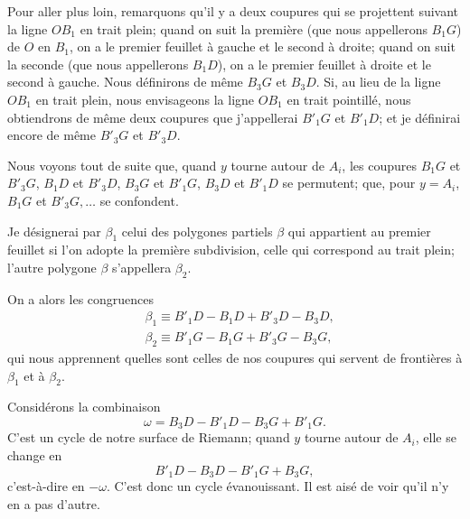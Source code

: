 \documentclass{article}
\begin{document}
Pour aller plus loin, remarquons qu'il y a deux coupures qui se projettent suivant la ligne $OB_{1}$ en trait plein; quand on suit la première (que nous appellerons $B_{1}G$) de $O$ en $B_{1}$, on a le premier feuillet à gauche et le second à droite; quand on suit la seconde (que nous appellerons $B_{1}D$), on a le premier feuillet à droite et le second à gauche. Nous définirons de même $B_{3}G$ et $B_{3}D$. Si, au lieu de la ligne $OB_{1}$ en trait plein, nous envisageons la ligne $OB_{1}$ en trait pointillé, nous obtiendrons de même deux coupures que j'appellerai $B'_{1}G$ et $B'_{1}D$; et je définirai encore de même $B'_{3}G$ et $B'_{3}D$.

Nous voyons tout de suite que, quand $y$ tourne autour de $A_{i}$, les coupures $B_{1}G$ et $B'_{3}G$, $B_{1}D$ et $B'_{3}D$, $B_{3}G$ et $B'_{1}G$, $B_{3}D$ et $B'_{1}D$ se permutent; que, pour $y = A_{i}$, $B_{1}G$ et $B'_{3}G, \ldots$ se confondent.

Je désignerai par $\beta_{1}$ celui des polygones partiels $\beta$ qui appartient au premier feuillet si l'on adopte la première subdivision, celle qui correspond au trait plein; l'autre polygone $\beta$ s'appellera $\beta_{2}$.

On a alors les congruences
\[ \begin{aligned} &\beta_{1} \equiv B'_{1}D - B_{1}D + B'_{3}D - B_{3}D,\\ &\beta_{2} \equiv B'_{1}G - B_{1}G + B'_{3}G - B_{3}G, \end{aligned} \]
qui nous apprennent quelles sont celles de nos coupures qui servent de frontières à $\beta_{1}$ et à $\beta_{2}$.

Considérons la combinaison
\[ \omega = B_{3}D - B'_{1}D - B_{3}G + B'_{1}G. \]
C'est un cycle de notre surface de Riemann; quand $y$ tourne autour de $A_{i}$, elle se change en
\[ B'_{1}D - B_{3}D - B'_{1}G + B_{3}G, \]
c'est-à-dire en $-\omega$. C'est donc un cycle évanouissant. Il est aisé de voir qu'il n'y en a pas d'autre.

\end{document}
